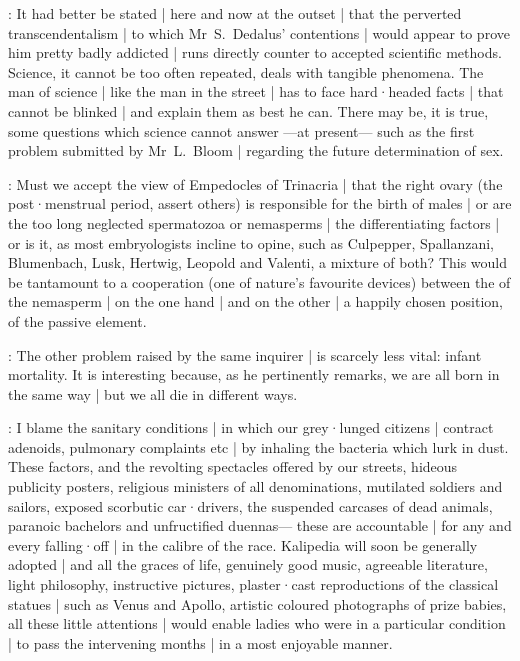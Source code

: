

:
It had better be stated |
here and now at the outset |
that the perverted transcendentalism |
to which Mr~S.~Dedalus' contentions |
would appear to prove him pretty badly addicted |
runs directly counter to accepted scientific methods.
Science,
it cannot be too often repeated,
deals with tangible phenomena.
The man of science |
like the man in the street |
has to face hard·headed facts |
that cannot be blinked |
and explain them as best he can.
There may be,
it is true,
some questions which science cannot answer%
---at present---%
such as the first problem submitted by Mr~L.~Bloom |
regarding the future determination of sex.

:
Must we accept the view of Empedocles of Trinacria |
that the right ovary
(the post·menstrual period,
assert others)
is responsible for the birth of males |
or are the too long neglected spermatozoa or nemasperms |
the differentiating factors |
or is it,
as most embryologists incline to opine,
such as Culpepper,
Spallanzani,
Blumenbach,
Lusk,
Hertwig,
Leopold and
Valenti,
a mixture of both?
This would be tantamount to a cooperation
(one of nature's favourite devices)
between the  of the nemasperm |
on the one hand |
and on the other |
a happily chosen position,
 of the passive element.

:
The other problem raised by the same inquirer |
is scarcely less vital:
infant mortality.
It is interesting because,
as he pertinently remarks,
we are all born in the same way |
but we all die in different ways.

\mulligan:
I blame the sanitary conditions |
in which our grey·lunged citizens |
contract adenoids,
pulmonary complaints etc |
by inhaling the bacteria which lurk in dust.
These factors,
and the revolting spectacles offered by our streets,
hideous publicity posters,
religious ministers of all denominations,
mutilated soldiers and sailors,
exposed scorbutic car·drivers,
the suspended carcases of dead animals,
paranoic bachelors and unfructified duennas---%
these are accountable |
for any and every falling·off |
in the calibre of the race.
Kalipedia will soon be generally adopted |
and all the graces of life,
genuinely good music,
agreeable literature,
light philosophy,
instructive pictures,
plaster·cast reproductions of the classical statues |
such as Venus and Apollo,
artistic coloured photographs of prize babies,
all these little attentions |
would enable ladies who were in a particular condition |
to pass the intervening months |
in a most enjoyable manner.

